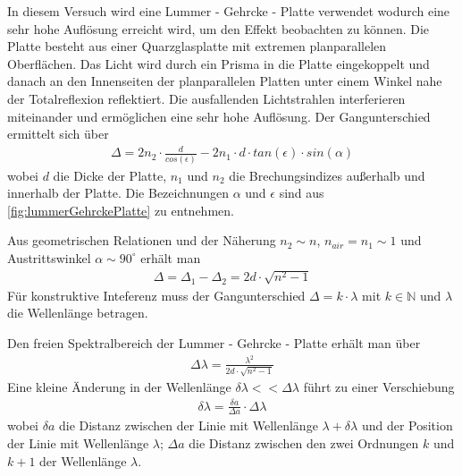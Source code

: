 \documentclass[11pt,a4paper]{article}
\begin{document}
In diesem Versuch wird eine Lummer - Gehrcke - Platte verwendet wodurch eine sehr hohe Auflösung erreicht wird, um den Effekt beobachten zu können. Die Platte besteht aus einer Quarzglasplatte mit extremen planparallelen Oberflächen. Das Licht wird durch ein Prisma in die Platte eingekoppelt und danach an den Innenseiten der planparallelen Platten unter einem Winkel nahe der Totalreflexion reflektiert. Die ausfallenden Lichtstrahlen interferieren miteinander und ermöglichen eine sehr hohe Auflösung. Der Gangunterschied ermittelt sich über
\begin{align}
	\Delta = 2n_2 \cdot \frac{d}{cos(\epsilon)} - 2n_1 \cdot d \cdot tan(\epsilon) \cdot sin(\alpha)
\end{align}
wobei $d$ die Dicke der Platte, $n_1$ und $n_2$ die Brechungsindizes außerhalb und innerhalb der Platte. Die Bezeichnungen $\alpha$ und $\epsilon$ sind aus \autoref{fig:lummerGehrckePlatte} zu entnehmen.

Aus geometrischen Relationen und der Näherung $n_2 \sim n$, $n_{air} = n_1 \sim 1$ und Austrittswinkel $\alpha \sim 90^\circ$ erhält man
\begin{align}
	\Delta = \Delta_1 - \Delta_2 = 2d \cdot \sqrt{n^2 - 1}
\end{align}
Für konstruktive Inteferenz muss der Gangunterschied $\Delta = k \cdot \lambda$ mit $k \in \mathbb{N} $ und $\lambda$ die Wellenlänge betragen.

Den freien Spektralbereich der Lummer - Gehrcke - Platte erhält man über
\begin{align}
	\Delta \lambda = \frac{\lambda^2}{2d \cdot \sqrt{n^2 - 1}}
\end{align}
Eine kleine Änderung in der Wellenlänge $\delta \lambda << \Delta \lambda$ führt zu einer Verschiebung
\begin{align}
	\delta \lambda = \frac{\delta a}{\Delta a} \cdot \Delta \lambda
\end{align}
wobei $\delta a$ die Distanz zwischen der Linie mit Wellenlänge $\lambda + \delta \lambda$ und der Position der Linie mit Wellenlänge $\lambda$; $\Delta a$ die Distanz zwischen den zwei Ordnungen $k$ und $k + 1$ der Wellenlänge $\lambda$.
\end{document}

